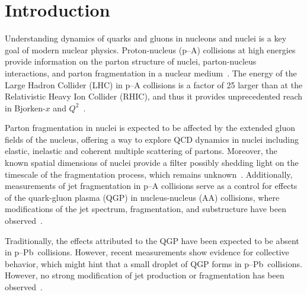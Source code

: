 \documentclass[ALICE,manyauthors]{cernphprep}
\newcommand{\pPb}          {\mbox{p--Pb}\xspace}
\begin{document}
\section{Introduction}
\label{sec:introduction}
Understanding dynamics of quarks and gluons in nucleons and nuclei is a key goal of modern nuclear physics. Proton-nucleus (p--A) collisions at high energies provide information on the parton structure of nuclei, parton-nucleus interactions, and parton fragmentation in a nuclear medium~\cite{Accardi:2009qv}. The energy of the Large Hadron Collider (LHC) in p--A collisions is a factor of 25 larger than at the Relativistic Heavy Ion Collider (RHIC), and thus it provides unprecedented reach in Bjorken-$x$ and $Q^{2}$~\cite{Salgado:2011wc}. 

Parton fragmentation in nuclei is expected to be affected by the extended gluon fields of the nucleus, offering a way to explore QCD dynamics in nuclei including elastic, inelastic and coherent multiple scattering of partons. Moreover, the known spatial dimensions of nuclei provide a filter possibly shedding light on the timescale of the fragmentation process, which remains unknown~\cite{Accardi:2009qv,Accardi:2012qut}. Additionally, measurements of jet fragmentation in p--A collisions serve as a control for effects of the quark-gluon plasma (QGP) in nucleus-nucleus (AA) collisions, where modifications of the jet spectrum, fragmentation, and substructure have been observed~\cite{Connors:2017ptx}.

Traditionally, the effects attributed to the QGP 
have been expected to be absent in \pPb~collisions. However, recent measurements show evidence for collective behavior, which might hint that a small droplet of QGP forms in \pPb~collisions. However, no strong modification of jet production or fragmentation has been observed~\cite{Nagle:2018nvi}.   
\end{document}
